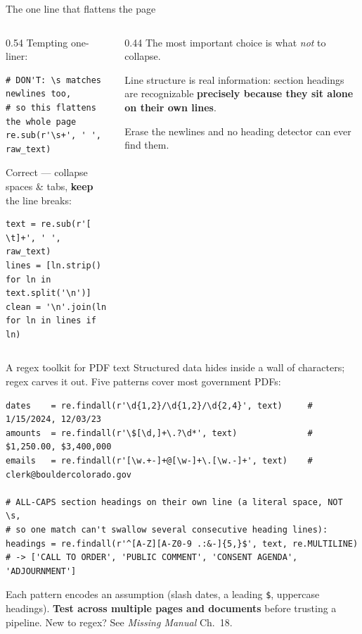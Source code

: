 \documentclass[9pt,aspectratio=169]{beamer}
\begin{document}
\begin{frame}[fragile]{The one line that flattens the page}
    \begin{columns}[T]
        \begin{column}{0.54\textwidth}
        Tempting one-liner:
\begin{lstlisting}
# DON'T: \s matches newlines too,
# so this flattens the whole page
re.sub(r'\s+', ' ', raw_text)
\end{lstlisting}
        Correct --- collapse spaces \& tabs, \textbf{keep} the line breaks:
\begin{lstlisting}
text = re.sub(r'[ \t]+', ' ', raw_text)
lines = [ln.strip() for ln in text.split('\n')]
clean = '\n'.join(ln for ln in lines if ln)
\end{lstlisting}
        \end{column}
        \begin{column}{0.44\textwidth}
            The most important choice is what \textit{not} to collapse.

            \vspace{0.75em}

            Line structure is real information: section headings are recognizable \textbf{precisely because they sit alone on their own lines}.

            \vspace{0.75em}

            Erase the newlines and no heading detector can ever find them.
        \end{column}
    \end{columns}
\end{frame}

\begin{frame}[fragile]{A regex toolkit for PDF text}
    Structured data hides inside a wall of characters; regex carves it out. Five patterns cover most government PDFs:
\begin{lstlisting}
dates    = re.findall(r'\d{1,2}/\d{1,2}/\d{2,4}', text)     # 1/15/2024, 12/03/23
amounts  = re.findall(r'\$[\d,]+\.?\d*', text)              # $1,250.00, $3,400,000
emails   = re.findall(r'[\w.+-]+@[\w-]+\.[\w.-]+', text)    # clerk@bouldercolorado.gov

# ALL-CAPS section headings on their own line (a literal space, NOT \s,
# so one match can't swallow several consecutive heading lines):
headings = re.findall(r'^[A-Z][A-Z0-9 .:&-]{5,}$', text, re.MULTILINE)
# -> ['CALL TO ORDER', 'PUBLIC COMMENT', 'CONSENT AGENDA', 'ADJOURNMENT']
\end{lstlisting}
    Each pattern encodes an assumption (slash dates, a leading \texttt{\$}, uppercase headings). \textbf{Test across multiple pages and documents} before trusting a pipeline. New to regex? See \textit{Missing Manual} Ch.~18.
\end{frame}
\end{document}
